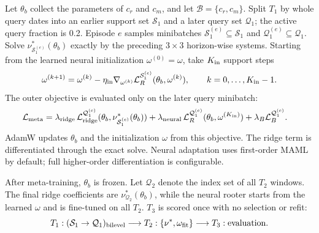 \documentclass[10pt]{article}
\newcommand{\Tone}{T_1}
\newcommand{\Ttwo}{T_2}
\newcommand{\Tthree}{T_3}
\begin{document}
\iffalse
Let $\theta_b$ collect the parameters of $c_r$ and $c_m$, and let
$\mathcal B=\{c_r,c_m\}$. Split $\Tone$ by whole query dates into an earlier
support set $\mathcal S_1$ and a later query set $\mathcal Q_1$; the active
query fraction is 0.2. Episode $e$ samples minibatches
$\mathcal S_1^{(e)}\subseteq\mathcal S_1$ and
$\mathcal Q_1^{(e)}\subseteq\mathcal Q_1$. Solve
$\nu^*_{\mathcal S_1^{(e)}}(\theta_b)$ exactly by the preceding $3\times3$
horizon-wise systems. Starting from the learned neural initialization
$\omega^{(0)}=\omega$, take $K_{\rm in}$ support steps
\[
 \omega^{(k+1)}=\omega^{(k)}-\eta_{\rm in}
 \nabla_{\omega^{(k)}}\mathcal L_R^{\mathcal S_1^{(e)}}
 (\theta_b,\omega^{(k)}),\qquad k=0,\ldots,K_{\rm in}-1.
\]
The outer objective is evaluated only on the later query minibatch:
\begin{align}
 \mathcal L_{\rm meta}
 &=\lambda_{\rm ridge}\,
 \mathcal L_{\rm ridge}^{\mathcal Q_1^{(e)}}
 (\theta_b,\nu^*_{\mathcal S_1^{(e)}}(\theta_b))
 +\lambda_{\rm neural}\,
 \mathcal L_R^{\mathcal Q_1^{(e)}}(\theta_b,\omega^{(K_{\rm in})})
 +\lambda_B\mathcal L_B^{\mathcal Q_1^{(e)}}.
\end{align}
AdamW updates $\theta_b$ and the initialization $\omega$ from this objective.
The ridge term is differentiated through the exact solve. Neural adaptation uses
first-order MAML by default; full higher-order differentiation is configurable.

After meta-training, $\theta_b$ is frozen. Let $\mathcal Q_2$ denote the index
set of all $\Ttwo$ windows. The final ridge coefficients are
$\nu^*_{\mathcal Q_2}(\theta_b)$, while the neural rooter starts
from the learned $\omega$ and is fine-tuned on all $\Ttwo$. $\Tthree$ is scored
once with no selection or refit:
\[
 \Tone:(\mathcal S_1\rightarrow\mathcal Q_1)_{\rm bilevel}
 \longrightarrow \Ttwo:\{\nu^*,\omega_{\rm fit}\}
 \longrightarrow \Tthree:\text{evaluation}.
\]
\end{document}
